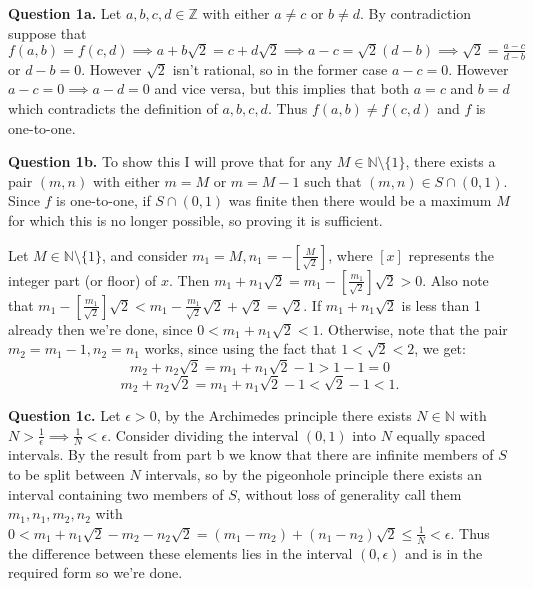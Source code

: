 \documentclass[letterpaper, reqno,11pt]{article}
\begin{document}
\title{}
\date{29/09/23}
\author{Xander Naumenko}
\maketitle

{\medskip\noindent\bf Question 1a.} Let $a,b,c,d\in \mathbb{Z}$ with either $a\neq c$ or $b\neq d$. By contradiction suppose that $f(a,b)=f(c,d)\implies a+b\sqrt{2}=c+d\sqrt{2}\implies a-c=\sqrt{2}\left( d-b \right) \implies \sqrt{2}=\frac{a-c}{d-b}$ or $d-b=0$. However $\sqrt{2}$ isn't rational, so in the former case $a-c=0$. However $a-c=0 \implies a-d=0$ and vice versa, but this implies that both $a=c$ and $b=d$ which contradicts the definition of $a,b,c,d$. Thus $f(a,b)\neq f(c,d)$ and $f$ is one-to-one.

{\medskip\noindent\bf Question 1b.} To show this I will prove that for any $M\in \mathbb{N}\setminus \{1\}$, there exists a pair $(m,n)$ with either $m=M$ or $m=M-1$ such that $(m,n)\in S\cap(0,1)$. Since $f$ is one-to-one, if $S\cap(0,1)$ was finite then there would be a maximum $M$ for which this is no longer possible, so proving it is sufficient.

Let $M\in\mathbb{N}\setminus \{1\}$, and consider $m_1=M,n_1=-\left[\frac{M}{\sqrt{2}}\right]$, where $[x]$ represents the integer part (or floor) of $x$. Then $m_1+n_1\sqrt{2}=m_1-\left[\frac{m_1}{\sqrt{2}}\right]\sqrt{2}> 0$. Also note that $m_1-\left[\frac{m_1}{\sqrt{2}}\right]\sqrt{2}< m_1-\frac{m_1}{\sqrt{2}}\sqrt{2}+\sqrt{2}=\sqrt{2}$. If $m_1+n_1\sqrt{2}$ is less than 1 already then we're done, since $0<m_1+n_1\sqrt{2}<1$. Otherwise, note that the pair $m_2=m_1-1,n_2=n_1$ works, since using the fact that $1<\sqrt{2}<2$, we get:
\[
m_2+n_2\sqrt{2}=m_1+n_1\sqrt{2}-1 > 1-1=0
\]
\[
m_2+n_2\sqrt{2}=m_1+n_1\sqrt{2}-1<\sqrt{2}-1<1
.\]

{\medskip\noindent\bf Question 1c.} Let $\epsilon>0$, by the Archimedes principle there exists $N\in \mathbb{N}$ with $N> \frac{1}{\epsilon}\implies \frac{1}{N}< \epsilon$. Consider dividing the interval $(0,1)$ into $N$ equally spaced intervals. By the result from part b we know that there are infinite members of $S$ to be split between $N$ intervals, so by the pigeonhole principle there exists an interval containing two members of $S$, without loss of generality call them $m_1,n_1,m_2,n_2$ with $0<m_1+n_1\sqrt{2}-m_2-n_2\sqrt{2}=(m_1-m_2)+(n_1-n_2)\sqrt{2}\leq\frac{1}{N}<\epsilon$. Thus the difference between these elements lies in the interval $(0,\epsilon)$ and is in the required form so we're done.
\end{document}
